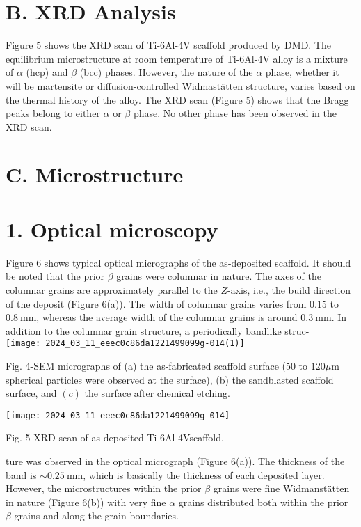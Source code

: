 \documentclass[10pt]{article}
\begin{document}
\section*{B. XRD Analysis}
Figure 5 shows the XRD scan of Ti-6Al-4V scaffold produced by DMD. The equilibrium microstructure at room temperature of Ti-6Al-4V alloy is a mixture of $\alpha$ (hcp) and $\beta$ (bcc) phases. However, the nature of the $\alpha$ phase, whether it will be martensite or diffusion-controlled Widmastätten structure, varies based on the thermal history of the alloy. The XRD scan (Figure 5) shows that the Bragg peaks belong to either $\alpha$ or $\beta$ phase. No other phase has been observed in the XRD scan.

\section*{C. Microstructure}
\section*{1. Optical microscopy}
Figure 6 shows typical optical micrographs of the as-deposited scaffold. It should be noted that the prior $\beta$ grains were columnar in nature. The axes of the columnar grains are approximately parallel to the $Z$-axis, i.e., the build direction of the deposit (Figure 6(a)). The width of columnar grains varies from 0.15 to $0.8 \mathrm{~mm}$, whereas the average width of the columnar grains is around $0.3 \mathrm{~mm}$. In addition to the columnar grain structure, a periodically bandlike struc-\\
\texttt{[image: 2024\_03\_11\_eeec0c86da1221499099g-014(1)]}

Fig. 4-SEM micrographs of (a) the as-fabricated scaffold surface (50 to $120 \mu \mathrm{m}$ spherical particles were observed at the surface), (b) the sandblasted scaffold surface, and $(c)$ the surface after chemical etching.

\begin{center}
\texttt{[image: 2024\_03\_11\_eeec0c86da1221499099g-014]}
\end{center}

Fig. 5-XRD scan of as-deposited Ti-6Al-4Vscaffold.

ture was observed in the optical micrograph (Figure 6(a)). The thickness of the band is $\sim 0.25 \mathrm{~mm}$, which is basically the thickness of each deposited layer. However, the microstructures within the prior $\beta$ grains were fine Widmanstätten in nature (Figure 6(b)) with very fine $\alpha$ grains distributed both within the prior $\beta$ grains and along the grain boundaries.
\end{document}
